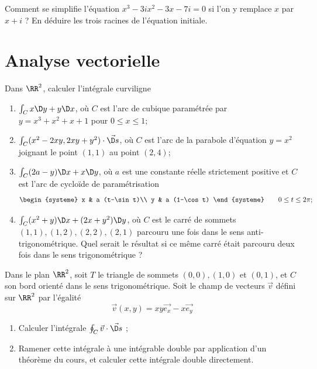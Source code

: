 \documentclass[12pt,french,oneside,a4paper]{memoir} %
\begin{document}
\begin{exo}
Comment se simplifie l'équation $x^3-3ix^2-3x-7i=0$ si l'on y remplace 
$x$ par $x+i$ ? En déduire les trois racines de l'équation initiale.
\end{exo}

\chapter{Analyse vectorielle}
\begin{exo}
Dans $\RR^2$, calculer l'intégrale curviligne
\begin{enumerate}
\item $\int_{C} x \D y + y \D x$, où $C$ est l'arc de cubique paramétrée par $y = x^{3} + x^{2} + x + 1$ pour $0 \leq x \leq 1$;
\item $\int_{C} (x^{2} - 2xy, 2xy + y^{2}) \cdot \vec{\D s}$, où $C$ est l'arc de la parabole d'équation $ y = x^{2} $ joignant le point $(1,1)$ au point $(2,4)$;
\item $\int_{C} (2a - y) \D x + x \D y$, où $a$ est une constante réelle strictement positive et $C$ est l'arc de cycloïde de paramétrisation
  \begin{equation*}
    \begin{systeme}
      x & a (t-\sin t)\\
      y & a (1-\cos t)
    \end{systeme} \qquad 0 \leq t \leq 2\pi;
  \end{equation*}
\item $\int_{C} (x^{2} + y)\D x + (2x + y^{2})\D y$, où $C$ est le carré de sommets $(1,1), (1,2), (2,2), (2,1)$ parcouru une fois dans le sens anti-trigonométrique. Quel serait le résultat si ce même carré était parcouru deux fois dans le sens trigonométrique ?
\end{enumerate}
\end{exo}

\begin{exo}
Dans le plan $\RR^{2}$, soit $T$ le triangle de sommets $(0,0), (1,0)$ et $(0,1)$, et $C$ son bord orienté dans le sens trigonométrique. Soit le champ de vecteurs $\vec v$ défini sur $\RR^{2}$ par l'égalité
\begin{equation*}
  \vec v(x,y) = x y \vec{e_{x}} - x \vec{e_{y}}  
\end{equation*}
\begin{enumerate}
\item Calculer l'intégrale $\oint_{C} \vec v \cdot \vec{\D s}$ ;
\item Ramener cette intégrale à une intégrable double par application d'un théorème du cours, et calculer cette intégrale double directement.
\end{enumerate}
\end{exo}
\end{document}
